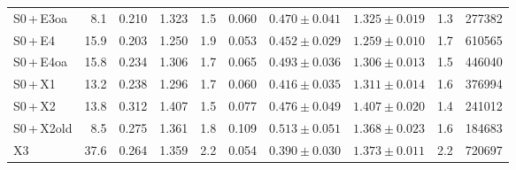 \begin{tabular}{@{}l r r r r r r r r r@{}}
S0\,+\,E3oa & 8.1 & 0.210 & 1.323 & 1.5 & 0.060 & $0.470\pm0.041$ & $1.325\pm0.019$ & 1.3 & 277382 \\
S0\,+\,E4 & 15.9 & 0.203 & 1.250 & 1.9 & 0.053 & $0.452\pm0.029$ & $1.259\pm0.010$ & 1.7 & 610565 \\
S0\,+\,E4oa & 15.8 & 0.234 & 1.306 & 1.7 & 0.065 & $0.493\pm0.036$ & $1.306\pm0.013$ & 1.5 & 446040 \\
S0\,+\,X1 & 13.2 & 0.238 & 1.296 & 1.7 & 0.060 & $0.416\pm0.035$ & $1.311\pm0.014$ & 1.6 & 376994 \\
S0\,+\,X2 & 13.8 & 0.312 & 1.407 & 1.5 & 0.077 & $0.476\pm0.049$ & $1.407\pm0.020$ & 1.4 & 241012 \\
S0\,+\,X2old & 8.5 & 0.275 & 1.361 & 1.8 & 0.109 & $0.513\pm0.051$ & $1.368\pm0.023$ & 1.6 & 184683 \\
X3 & 37.6 & 0.264 & 1.359 & 2.2 & 0.054 & $0.390\pm0.030$ & $1.373\pm0.011$ & 2.2 & 720697 \\
\bottomrule
\end{tabular}
